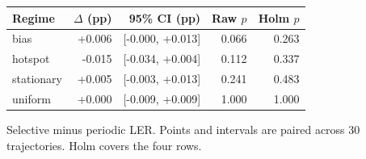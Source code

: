 \begin{center}\small
\begin{tabular}{lrrrr}
\hline
Regime & $\Delta$ (pp) & 95\% CI (pp) & Raw $p$ & Holm $p$ \\
\hline
bias & +0.006 & [-0.000, +0.013] & 0.066 & 0.263 \\
hotspot & -0.015 & [-0.034, +0.004] & 0.112 & 0.337 \\
stationary & +0.005 & [-0.003, +0.013] & 0.241 & 0.483 \\
uniform & +0.000 & [-0.009, +0.009] & 1.000 & 1.000 \\
\hline\end{tabular}
\par\smallskip\parbox{0.93\linewidth}{\small Selective minus periodic LER. Points and intervals are paired across 30 trajectories. Holm covers the four rows.}
\end{center}
